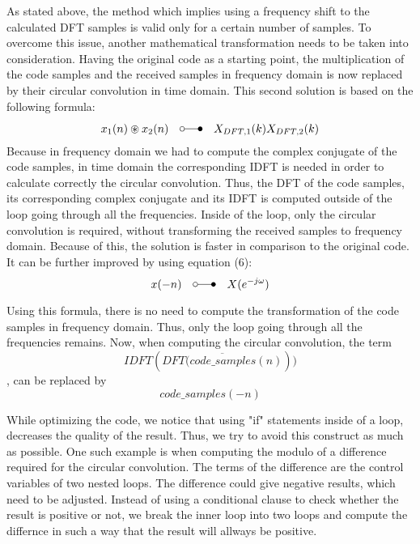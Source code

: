 	  		As stated above, the method which implies using a frequency shift to the calculated DFT samples is valid only for a certain number of samples. To overcome this issue, another mathematical transformation needs to be taken into consideration. Having the original code as a starting point, the multiplication of the code samples and the received samples in frequency domain is now replaced by their circular convolution in time domain. This second solution is based on the following formula:
      \begin{equation} 
  				\label{eq:circular_conv}
  				x_{1}(n) \circledast x_{2}(n)\quad \laplace\quad X_{DFT,1}(k)X_{DFT,2}(k)
  			\end{equation} 
      Because in frequency domain we had to compute the complex conjugate of the code samples, in time domain the corresponding IDFT is needed in order to calculate correctly the circular convolution. Thus, the DFT of the code samples, its corresponding complex conjugate and its IDFT is computed outside of the loop going through all the frequencies. Inside of the loop, only the circular convolution is required, without transforming the received samples to frequency domain. Because of this, the solution is faster in comparison to the original code. It can be further improved by using equation (6):
      \begin{equation} 
      				\label{eq:complex_conj}
              x(-n) \quad \laplace\quad X(e^{-j{\omega}})
      \end{equation} 
      
      Using this formula, there is no need to compute the transformation of the code samples in frequency domain. Thus, only the loop going through all the frequencies remains. Now, when computing the circular convolution, the term \begin{equation} \label{eq:idft_dft} IDFT(\overline {DFT(code\_samples(n)})) \end{equation}, can be replaced by \begin{equation} \label{eq:code_samples} code\_samples(-n) \end{equation}\newline 
      
      While optimizing the code, we notice that using "if" statements inside of a loop, decreases the quality of the result. Thus, we try to avoid this construct as much as possible. One such example is when computing the modulo of a difference required for the circular convolution. The terms of the difference are the control variables of two nested loops. The difference could give negative results, which need to be adjusted. Instead of using a conditional clause to check whether the result is positive or not, we break the inner loop into two loops and compute the differnce in such a way that the result will allways be positive. \newline
      
